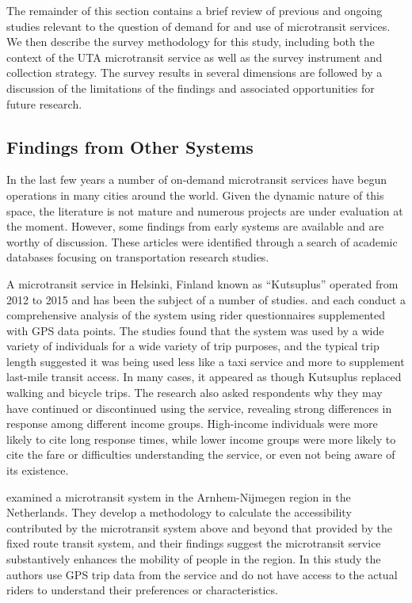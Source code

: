 \documentclass[smartcities,article,submit,moreauthors,pdftex]{mdpi}
\begin{document}
The remainder of this section contains a brief review of previous and ongoing
studies relevant to the question of demand for and use of microtransit services.
We then describe the survey methodology for this study, including both the
context of the UTA microtransit service as well as the survey instrument and
collection strategy. The survey results in several dimensions are followed by a
discussion of the limitations of the findings and associated opportunities for
future research.

\hypertarget{findings-from-other-systems}{%
\subsection{Findings from Other Systems}\label{findings-from-other-systems}}

In the last few years a number of on-demand microtransit services have begun
operations in many cities around the world. Given the dynamic nature of this
space, the literature is not mature and numerous projects are under evaluation
at the moment. However, some findings from early systems are available and are
worthy of discussion. These articles were identified through a search of academic
databases focusing on transportation research studies.

A microtransit service in Helsinki, Finland known as ``Kutsuplus'' operated from
2012 to 2015 and has been the subject of a number of studies. \citet{weckstrom2018} and
\citet{Haglund2019} each conduct a comprehensive analysis of the system using rider
questionnaires supplemented with GPS data points. The studies found that the
system was used by a wide variety of individuals for a wide variety of trip
purposes, and the typical trip length suggested it was being used less like a
taxi service and more to supplement last-mile transit access. In many cases, it
appeared as though Kutsuplus replaced walking and bicycle trips. The
\citet{weckstrom2018} research also asked respondents why they may have continued or
discontinued using the service, revealing strong differences in response among
different income groups. High-income individuals were more likely to cite long
response times, while lower income groups were more likely to cite the fare or
difficulties understanding the service, or even not being aware of its
existence.

\citet{alonso2018} examined a microtransit system in the Arnhem-Nijmegen region in the
Netherlands. They develop a methodology to calculate the accessibility
contributed by the microtransit system above and beyond that provided by the
fixed route transit system, and their findings suggest the microtransit
service substantively enhances the mobility of people in the region. In this
study the authors use GPS trip data from the service and do not have access to
the actual riders to understand their preferences or characteristics.
\end{document}
